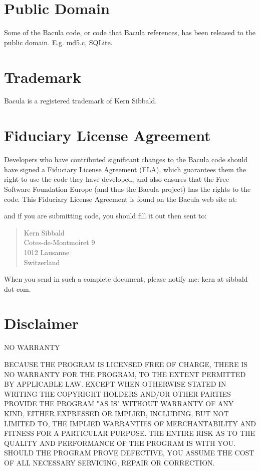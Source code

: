 \section{Public Domain}

Some of the Bacula code, or code that Bacula references, has been released
to the public domain.  E.g.  md5.c, SQLite.

\section{Trademark}

Bacula\raisebox{.6ex}{\textsuperscript{\textregistered}} is a registered
trademark of Kern Sibbald.

\section{Fiduciary License Agreement}
Developers who have contributed significant changes to the Bacula code
should have signed a Fiduciary License Agreement (FLA), which
guarantees them the right to use the code they have developed, and also
ensures that the Free Software Foundation Europe (and thus the Bacula
project) has the rights to the code.  This Fiduciary License Agreement
is found on the Bacula web site at:


and if you are submitting code, you should fill it out then sent to:

\begin{quote}
     Kern Sibbald \\
     Cotes-de-Montmoiret 9 \\
     1012 Lausanne \\
     Switzerland \\
\end{quote}

When you send in such a
complete document, please notify me: kern at sibbald dot com.


\section{Disclaimer}

NO WARRANTY

BECAUSE THE PROGRAM IS LICENSED FREE OF CHARGE, THERE IS NO WARRANTY FOR THE
PROGRAM, TO THE EXTENT PERMITTED BY APPLICABLE LAW. EXCEPT WHEN OTHERWISE
STATED IN WRITING THE COPYRIGHT HOLDERS AND/OR OTHER PARTIES PROVIDE THE
PROGRAM "AS IS" WITHOUT WARRANTY OF ANY KIND, EITHER EXPRESSED OR IMPLIED,
INCLUDING, BUT NOT LIMITED TO, THE IMPLIED WARRANTIES OF MERCHANTABILITY AND
FITNESS FOR A PARTICULAR PURPOSE. THE ENTIRE RISK AS TO THE QUALITY AND
PERFORMANCE OF THE PROGRAM IS WITH YOU. SHOULD THE PROGRAM PROVE DEFECTIVE,
YOU ASSUME THE COST OF ALL NECESSARY SERVICING, REPAIR OR CORRECTION.

